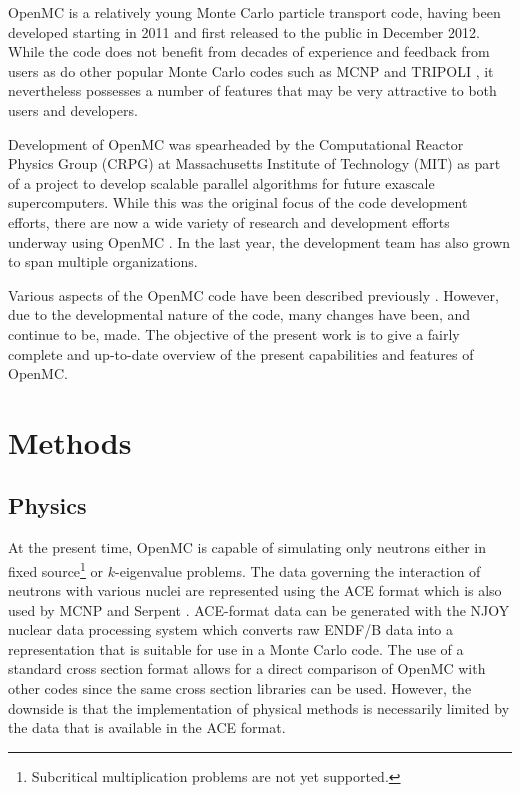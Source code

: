 \documentclass[5p,authoryear]{elsarticle}
\begin{document}
OpenMC is a relatively young Monte Carlo particle transport code, having been
developed starting in 2011 and first released to the public in December
2012. While the code does not benefit from decades of experience and feedback
from users as do other popular Monte Carlo codes such as MCNP
\citep{lanl-brown-2010} and TRIPOLI \citep{phytra-diop-2007}, it nevertheless
possesses a number of features that may be very attractive to both users and
developers.

Development of OpenMC was spearheaded by the Computational Reactor Physics Group
(CRPG) at Massachusetts Institute of Technology (MIT) as part of a project to
develop scalable parallel algorithms for future exascale supercomputers. While
this was the original focus of the code development efforts, there are now a
wide variety of research and development efforts underway using OpenMC
\citep{jcp-romano-2013, mc-nelson-2013, jcp-siegel-2013, ijhpca-siegel-2014,
  cpc-siegel-2014, ane-forget-2014}. In the last year, the development team has
also grown to span multiple organizations.

Various aspects of the OpenMC code have been described previously
\citep{ane-romano-2013, mc-romano-2013}. However, due to the developmental
nature of the code, many changes have been, and continue to be, made. The
objective of the present work is to give a fairly complete and up-to-date
overview of the present capabilities and features of OpenMC.

\section{Methods}

\subsection{Physics}

At the present time, OpenMC is capable of simulating only neutrons either in
fixed source\footnote{Subcritical multiplication problems are not yet
  supported.} or $k$-eigenvalue problems. The data governing the interaction of
neutrons with various nuclei are represented using the ACE format
\citep{lanl-x5-2008-ace} which is also used by MCNP and Serpent
\citep{vtt-leppanen-2012}. ACE-format data can be generated with the NJOY nuclear
data processing system \citep{lanl-macfarlane-2012} which converts raw ENDF/B
data into a representation that is suitable for use in a Monte Carlo code. The
use of a standard cross section format allows for a direct comparison of OpenMC
with other codes since the same cross section libraries can be used. However,
the downside is that the implementation of physical methods is necessarily
limited by the data that is available in the ACE format.
\end{document}
